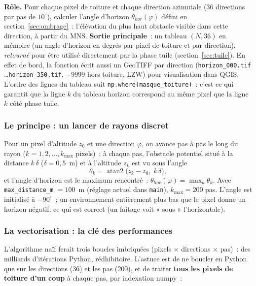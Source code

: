 \documentclass[11pt,a4paper]{article}
\newcommand{\fichier}[1]{\texttt{#1}}
\newcommand{\fonction}[1]{\texttt{#1}}
\begin{document}
\textbf{Rôle.} Pour chaque pixel de toiture et chaque direction azimutale (36
directions par pas de $10^\circ$), calculer l'angle d'horizon
$\theta_{hor}(\varphi)$ défini en section~\ref{sec:ombrage}~: l'élévation du
plus haut obstacle visible dans cette direction, à partir du MNS.
\textbf{Sortie principale}~: un tableau $(N, 36)$ en mémoire (un angle d'horizon
en degrés par pixel de toiture et par direction), \emph{retourné} pour être
utilisé directement par la phase tuile (section~\ref{sec:tuile}). En effet de
bord, la fonction écrit aussi un GeoTIFF par direction
(\fichier{horizon\_000.tif} \ldots \fichier{horizon\_350.tif}, $-9999$ hors
toiture, LZW) pour visualisation dans QGIS. L'ordre des lignes du tableau suit
\fonction{np.where(masque\_toiture)}~: c'est ce qui garantit que la ligne $k$ du
tableau horizon correspond au même pixel que la ligne $k$ côté phase tuile.

\subsubsection{Le principe : un lancer de rayons discret}

Pour un pixel d'altitude $z_0$ et une direction $\varphi$, on avance pas à pas
le long du rayon ($k = 1, 2, \ldots, k_{\max}$ pixels)~; à chaque pas, l'obstacle
potentiel situé à la distance $k\,\delta$ ($\delta = 0{,}5$~m) et à l'altitude
$z_k$ est vu sous l'angle
\begin{equation}
  \theta_k = \operatorname{atan2}\!\big(z_k - z_0,\; k\,\delta\big),
\end{equation}
et l'angle d'horizon est le maximum rencontré~:
$\theta_{hor}(\varphi) = \max_k \theta_k$. Avec
\fonction{max\_distance\_m} $= 100$~m (réglage actuel dans \fichier{main}),
$k_{\max} = 200$ pas. L'angle est initialisé à $-90^\circ$~; un environnement
entièrement plus bas que le pixel donne un horizon négatif, ce qui est correct
(un faîtage voit « sous » l'horizontale).

\subsubsection{La vectorisation : la clé des performances}

L'algorithme naïf ferait trois boucles imbriquées (pixels $\times$ directions
$\times$ pas)~: des milliards d'itérations Python, rédhibitoire. L'astuce est de
ne boucler en Python que sur les directions (36) et les pas (200), et de traiter
\textbf{tous les pixels de toiture d'un coup} à chaque pas, par indexation
numpy~:
\end{document}
